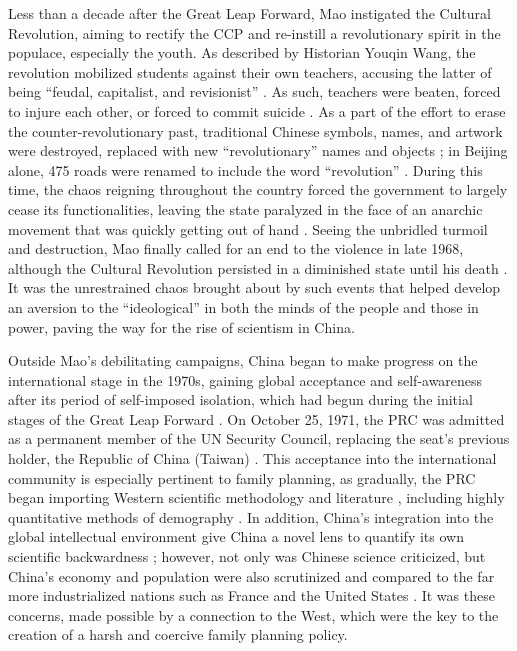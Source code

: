 Less than a decade after the Great Leap Forward, Mao instigated the Cultural Revolution, aiming to rectify the CCP and re-instill a revolutionary spirit in the populace, especially the youth. As described by Historian Youqin Wang, the revolution mobilized students against their own teachers, accusing the latter of being “feudal, capitalist, and revisionist” \autocite[pp.\ 6--32]{WangYouqin2001StudentAttacks}. As such, teachers were beaten, forced to injure each other, or forced to commit suicide \autocite[pp.\ 6--32]{WangYouqin2001StudentAttacks}. As a part of the effort to erase the counter-revolutionary past, traditional Chinese symbols, names, and artwork were destroyed, replaced with new “revolutionary” names and objects \autocite[pp.\ 61--62]{Lu2020RhetoricCulturalRevolution}; in Beijing alone, 475 roads were renamed to include the word “revolution” \autocite[p.\ 168]{Dutton1998}. During this time, the chaos reigning throughout the country forced the government to largely cease its functionalities, leaving the state paralyzed in the face of an anarchic movement that was quickly getting out of hand \autocite{Greenhalgh2008JustOneChild}. Seeing the unbridled turmoil and destruction, Mao finally called for an end to the violence in late 1968, although the Cultural Revolution persisted in a diminished state until his death \autocite{Phillips2016GuardianCulturalRevolution}. It was the unrestrained chaos brought about by such events that helped develop an aversion to the “ideological” in both the minds of the people and those in power, paving the way for the rise of scientism in China.

Outside Mao’s debilitating campaigns, China began to make progress on the international stage in the 1970s, gaining global acceptance and self-awareness after its period of self-imposed isolation, which had begun during the initial stages of the Great Leap Forward \autocite{Dreyer2007ChineseForeignPolicy}. On October 25, 1971, the PRC was admitted as a permanent member of the UN Security Council, replacing the seat’s previous holder, the Republic of China (Taiwan) \autocite{AIT2010UNRes2758}. This acceptance into the international community is especially pertinent to family planning, as gradually, the PRC began importing Western scientific methodology and literature \autocite[pp.\ 74--82]{Minami2024PeoplesDiplomacy}, including highly quantitative methods of demography \autocite[pp.\ 132--134]{Greenhalgh2008JustOneChild}. In addition, China’s integration into the global intellectual environment give China a novel lens to quantify its own scientific backwardness \autocite[p.\ 85]{Greenhalgh2008JustOneChild}; however, not only was Chinese science criticized, but China’s economy and population were also scrutinized and compared to the far more industrialized nations such as France and the United States \autocite[pp.\ 111-113, 118--120]{Greenhalgh2008JustOneChild}. It was these concerns, made possible by a connection to the West, which were the key to the creation of a harsh and coercive family planning policy.

